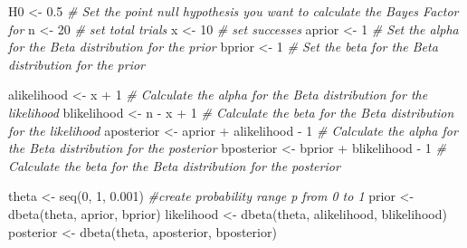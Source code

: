 \documentclass[
  oneside]{book}
\newenvironment{Shaded}{\begin{snugshade}}{\end{snugshade}}
\newcommand{\CommentTok}[1]{\textcolor[rgb]{0.56,0.35,0.01}{\textit{#1}}}
\newcommand{\DecValTok}[1]{\textcolor[rgb]{0.00,0.00,0.81}{#1}}
\newcommand{\FloatTok}[1]{\textcolor[rgb]{0.00,0.00,0.81}{#1}}
\newcommand{\FunctionTok}[1]{\textcolor[rgb]{0.00,0.00,0.00}{#1}}
\newcommand{\NormalTok}[1]{#1}
\newcommand{\OtherTok}[1]{\textcolor[rgb]{0.56,0.35,0.01}{#1}}
\newcommand{\SpecialCharTok}[1]{\textcolor[rgb]{0.00,0.00,0.00}{#1}}
\begin{document}
\begin{Shaded}
\begin{Highlighting}[]
\NormalTok{H0 }\OtherTok{\textless{}{-}} \FloatTok{0.5} \CommentTok{\# Set the point null hypothesis you want to calculate the Bayes Factor for}
\NormalTok{n }\OtherTok{\textless{}{-}} \DecValTok{20} \CommentTok{\# set total trials}
\NormalTok{x }\OtherTok{\textless{}{-}} \DecValTok{10} \CommentTok{\# set successes}
\NormalTok{aprior }\OtherTok{\textless{}{-}} \DecValTok{1} \CommentTok{\# Set the alpha for the Beta distribution for the prior}
\NormalTok{bprior }\OtherTok{\textless{}{-}} \DecValTok{1} \CommentTok{\# Set the beta for the Beta distribution for the prior}

\NormalTok{alikelihood }\OtherTok{\textless{}{-}}\NormalTok{ x }\SpecialCharTok{+} \DecValTok{1} \CommentTok{\# Calculate the alpha for the Beta distribution for the likelihood}
\NormalTok{blikelihood }\OtherTok{\textless{}{-}}\NormalTok{ n }\SpecialCharTok{{-}}\NormalTok{ x }\SpecialCharTok{+} \DecValTok{1} \CommentTok{\# Calculate the beta for the Beta distribution for the likelihood}
\NormalTok{aposterior }\OtherTok{\textless{}{-}}\NormalTok{ aprior }\SpecialCharTok{+}\NormalTok{ alikelihood }\SpecialCharTok{{-}} \DecValTok{1} \CommentTok{\# Calculate the alpha for the Beta distribution for the posterior}
\NormalTok{bposterior }\OtherTok{\textless{}{-}}\NormalTok{ bprior }\SpecialCharTok{+}\NormalTok{ blikelihood }\SpecialCharTok{{-}} \DecValTok{1} \CommentTok{\# Calculate the beta for the Beta distribution for the posterior}

\NormalTok{theta }\OtherTok{\textless{}{-}} \FunctionTok{seq}\NormalTok{(}\DecValTok{0}\NormalTok{, }\DecValTok{1}\NormalTok{, }\FloatTok{0.001}\NormalTok{) }\CommentTok{\#create probability range p from 0 to 1}
\NormalTok{prior }\OtherTok{\textless{}{-}} \FunctionTok{dbeta}\NormalTok{(theta, aprior, bprior)}
\NormalTok{likelihood }\OtherTok{\textless{}{-}} \FunctionTok{dbeta}\NormalTok{(theta, alikelihood, blikelihood)}
\NormalTok{posterior }\OtherTok{\textless{}{-}} \FunctionTok{dbeta}\NormalTok{(theta, aposterior, bposterior)}


\end{Highlighting}
\end{Shaded}
\end{document}
